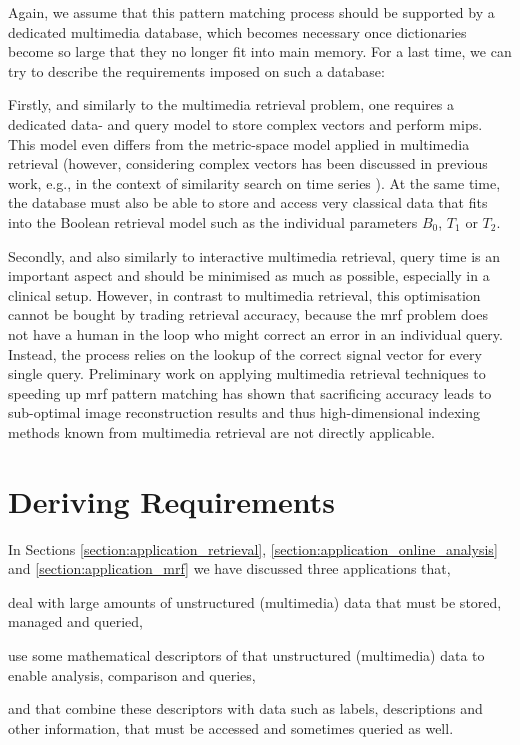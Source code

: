 Again, we assume that this pattern matching process should be supported by a dedicated multimedia database, which becomes necessary once dictionaries become so large that they no longer fit into main memory. For a last time, we can try to describe the requirements imposed on such a database: 

Firstly, and similarly to the multimedia retrieval problem, one requires a dedicated data- and query model to store complex vectors and perform \acrshort{mips}. This model even differs from the metric-space model applied in multimedia retrieval (however, considering complex vectors has been discussed in previous work, e.g., in the context of similarity search on time series \cite{Rafiei:1997Similarity}). At the same time, the database must also be able to store and access very classical data that fits into the Boolean retrieval model such as the individual parameters $B_0$, $T_1$ or $T_2$. 

Secondly, and also similarly to interactive multimedia retrieval, query time is an important aspect and should be minimised as much as possible, especially in a clinical setup. However, in contrast to multimedia retrieval, this optimisation cannot be bought by trading retrieval accuracy, because the \acrshort{mrf} problem does not have a human in the loop who might correct an error in an individual query. Instead, the process relies on the lookup of the correct signal vector for every single query. Preliminary work on applying multimedia retrieval techniques to speeding up \acrshort{mrf} pattern matching has shown that sacrificing accuracy leads to sub-optimal image reconstruction results \cite{Huerbin:2020Retrieval,Zihlmann:2021Magnetic} and thus high-dimensional indexing methods known from multimedia retrieval are not directly applicable.

\section{Deriving Requirements}
In Sections \ref{section:application_retrieval}, \ref{section:application_online_analysis} and \ref{section:application_mrf} we have discussed three applications that, 
\begin{enumerate*}[label=(\roman*)]
    \item deal with large amounts of unstructured (multimedia) data that must be stored, managed and queried,
    \item use some mathematical descriptors of that unstructured (multimedia) data to enable analysis, comparison and queries,
    \item and that combine these descriptors with data such as labels, descriptions and other information, that must be accessed and sometimes queried as well.
\end{enumerate*}


